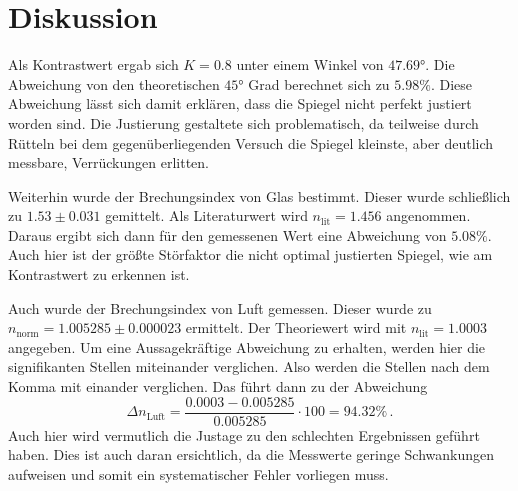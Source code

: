 \section{Diskussion}
\label{sec:Diskussion}
Als Kontrastwert ergab sich $K = 0.8$ unter einem Winkel von $47.69°$.
Die Abweichung von den theoretischen $45°$ Grad berechnet sich zu $5.98 \% $.
Diese Abweichung lässt sich damit erklären, dass die Spiegel nicht perfekt justiert worden sind.
Die Justierung gestaltete sich problematisch, da teilweise durch Rütteln bei dem gegenüberliegenden Versuch die Spiegel kleinste, aber deutlich messbare, Verrückungen erlitten.

Weiterhin wurde der Brechungsindex von Glas bestimmt.
Dieser wurde schließlich zu $1.53 \pm 0.031$ gemittelt.
Als Literaturwert wird $n_\text{lit} = 1.456$ angenommen.
Daraus ergibt sich dann für den gemessenen Wert eine Abweichung von $5.08 \%$.
Auch hier ist der größte Störfaktor die nicht optimal justierten Spiegel, wie am Kontrastwert zu erkennen ist.

Auch wurde der Brechungsindex von Luft gemessen.
Dieser wurde zu $n_{\text{norm}} = 1.005285 \pm 0.000023$ ermittelt.
Der Theoriewert wird mit $n_\text{lit} = 1.0003$ angegeben.
Um eine Aussagekräftige Abweichung  zu erhalten, werden hier die signifikanten Stellen miteinander verglichen.
Also werden die Stellen nach dem Komma mit einander verglichen.
Das führt dann zu der Abweichung
\begin{equation*}
\Delta n_\text{Luft} = \frac{0.0003 - 0.005285}{0.005285} \cdot 100 = 94.32 \% \, .
\end{equation*}
Auch hier wird vermutlich die Justage zu den schlechten Ergebnissen geführt haben.
Dies ist auch daran ersichtlich, da die Messwerte geringe Schwankungen aufweisen und somit ein systematischer Fehler vorliegen muss.
